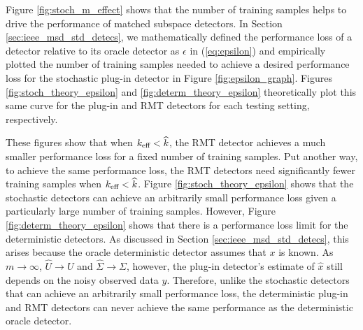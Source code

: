 Figure \ref{fig:stoch_m_effect} shows that the number of training samples helps to drive the performance of matched subspace detectors. In Section \ref{sec:ieee_msd_std_detecs}, we mathematically defined the performance loss of a detector relative to its oracle detector as $\epsilon$ in (\ref{eq:epsilon}) and empirically plotted the number of training samples needed to achieve a desired performance loss for the stochastic plug-in detector in Figure \ref{fig:epsilon_graph}. Figures \ref{fig:stoch_theory_epsilon} and \ref{fig:determ_theory_epsilon} theoretically plot this same curve for the plug-in and RMT detectors for each testing setting, respectively.

These figures show that when $k_\text{eff}<\widehat{k}$, the RMT detector achieves a much smaller performance loss for a fixed number of training samples. Put another way, to achieve the same performance loss, the RMT detectors need significantly fewer training samples when $k_\text{eff}<\widehat{k}$. Figure \ref{fig:stoch_theory_epsilon} shows that the stochastic detectors can achieve an arbitrarily small performance loss given a particularly large number of training samples. However, Figure \ref{fig:determ_theory_epsilon} shows that there is a performance loss limit for the deterministic detectors. As discussed in Section \ref{sec:ieee_msd_std_detecs}, this arises because the oracle deterministic detector assumes that $x$ is known. As $m\to\infty$, $\widehat{U}\to U$ and $\widehat{\Sigma}\to\Sigma$, however, the plug-in detector's estimate of $\widehat{x}$ still depends on the noisy observed data $y$. Therefore, unlike the stochastic detectors that can achieve an arbitrarily small performance loss, the deterministic plug-in and RMT detectors can never achieve the same performance as the deterministic oracle detector.

